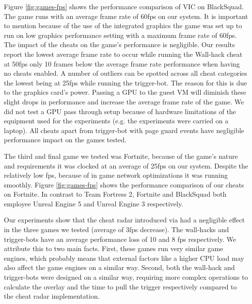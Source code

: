 Figure \ref{fig:games-fps} shows the performance comparison of VIC on BlackSquad. The game runs with an average frame rate of 60fps on our system. It is important to mention because of the use of the integrated graphics the game was set up to run on low graphics performance setting with a maximum frame rate of 60fps. The impact of the cheats on the game's performance is negligible. Our results report the lowest average frame rate to occur while running the Wall-hack cheat at 50fps only 10 frames below the average frame rate performance when having no cheats enabled. A number of outliers can be spotted across all cheat categories the lowest being at 25fps while running the trigger-bot. The reason for this is due to the graphics card's power. Passing a GPU to the guest VM will diminish these slight drops in performance and increase the average frame rate of the game. We did not test a GPU pass through setup because of hardware limitations of the equipment used for the experiments (e.g. the experiments were carried on a laptop). All cheats apart from trigger-bot with page guard events have negligible performance impact on the games tested. 




The third and final game we tested was Fortnite, because of the game's nature and requirements it was clocked at an average of 25fps on our system. Despite the relatively low fps, because of in game network optimizations it was running smoothly. Figure \ref{fig:games-fps} shows the performance comparison of our cheats on Fortnite. In contrast to Team Fortress 2, Fortnite and BlackSquad both employee Unreal Engine 5 and Unreal Engine 3 respectively. 

Our experiments show that the cheat radar introduced via \frameworkName had a negligible effect in the three games we tested (average of 3fps decrease). The wall-hacks and trigger-bots have an average performance loss of 10 and 8 fps respectively. We attribute this to two main facts. First, these games run very similar game engines, which probably means that external factors like a higher CPU load may also affect the game engines on a similar way. Second, both the wall-hack and trigger-bots were designed on a similar way, requiring more complex operations to calculate the overlay and the time to pull the trigger respectively compared to the cheat radar implementation. 


